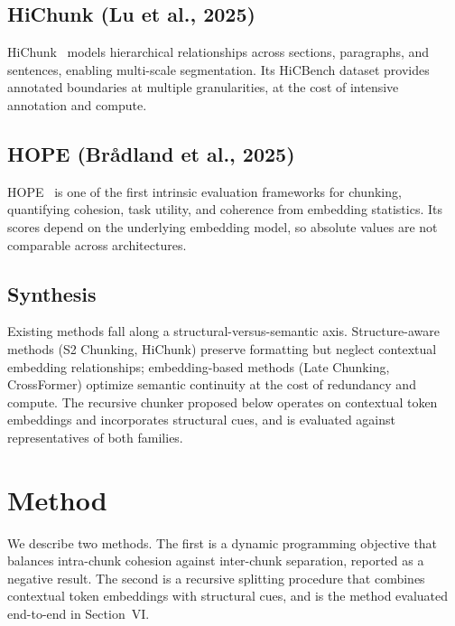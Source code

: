 \subsection{HiChunk (Lu et al., 2025)}
HiChunk~\cite{lu2025hichunk} models hierarchical relationships across sections, paragraphs, and sentences, enabling multi-scale segmentation. Its HiCBench dataset provides annotated boundaries at multiple granularities, at the cost of intensive annotation and compute.

\subsection{HOPE (Br{\aa}dland et al., 2025)}
HOPE~\cite{bradland2025hope} is one of the first intrinsic evaluation frameworks for chunking, quantifying cohesion, task utility, and coherence from embedding statistics. Its scores depend on the underlying embedding model, so absolute values are not comparable across architectures.

\subsection{Synthesis}
Existing methods fall along a structural-versus-semantic axis. Structure-aware methods (S2 Chunking, HiChunk) preserve formatting but neglect contextual embedding relationships; embedding-based methods (Late Chunking, CrossFormer) optimize semantic continuity at the cost of redundancy and compute. The recursive chunker proposed below operates on contextual token embeddings and incorporates structural cues, and is evaluated against representatives of both families.

\section{Method}
We describe two methods. The first is a dynamic programming objective that balances intra-chunk cohesion against inter-chunk separation, reported as a negative result. The second is a recursive splitting procedure that combines contextual token embeddings with structural cues, and is the method evaluated end-to-end in Section~VI.


